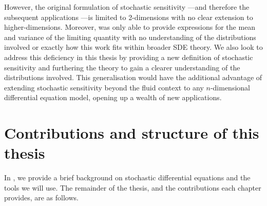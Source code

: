 However, the original formulation of stochastic sensitivity \citep{Balasuriya_2020_StochasticSensitivityComputable}---and therefore the subsequent applications \citep{Balasuriya_2020_UncertaintyFinitetimeLyapunov,BadzaEtAl_2023_HowSensitiveAre,FangOuellette_2021_AssessingInformationContent,FangEtAl_2020_DisentanglingResolutionPrecision}---is limited to 2-dimensions with no clear extension to higher-dimensions.
Moreover, \citet{Balasuriya_2020_StochasticSensitivityComputable} was only able to provide expressions for the mean and variance of the limiting quantity with no understanding of the distributions involved or exactly how this work fits within broader SDE theory.
We also look to address this deficiency in this thesis by providing a new definition of stochastic sensitivity and furthering the theory to gain a clearer understanding of the distributions involved.
This generalisation would have the additional advantage of extending stochastic sensitivity beyond the fluid context to any \(n\)-dimensional differential equation model, opening up a wealth of new applications.


\section{Contributions and structure of this thesis}\label{sec:intro_structure}
In , we provide a brief background on stochastic differential equations and the tools we will use.
The remainder of the thesis, and the contributions each chapter provides, are as follows.

